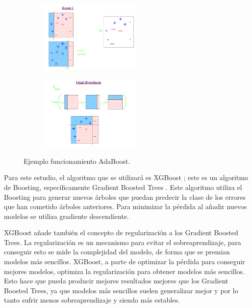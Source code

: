 \begin{figure}[H]
	\centering
	\begin{subfigure}{.4\textwidth}
		\centering
		\includegraphics[width=50mm]{imagenes/boosting_2.png}
	\end{subfigure}
	\hspace{0.01in}
	\begin{subfigure}{.4\textwidth}
		\centering
		\includegraphics[width=50mm]{imagenes/boosting_final.png}
	\end{subfigure}
	\caption{Ejemplo funcionamiento AdaBoost.}
	\label{fig:217}
\end{figure}
\verticalspace

Para este estudio, el algoritmo que se utilizará es XGBoost \cite{chen2016xgboost}; este es un algoritmo de Boosting, específicamente Gradient Boosted Trees \cite{friedman2002stochastic}. Este algoritmo utiliza el Boosting para generar nuevos árboles que puedan predecir la clase de los errores que han cometido árboles anteriores. Para minimizar la pérdida al añadir nuevos modelos se utiliza gradiente descendiente.\newline

XGBoost añade también el concepto de regularización a los Gradient Boosted Trees. La regularización es un mecanismo para evitar el sobreaprendizaje, para conseguir esto se mide la complejidad del modelo, de forma que se premian modelos más sencillos. XGBoost, a parte de optimizar la pérdida para conseguir mejores modelos, optimiza la regularización para obtener modelos más sencillos. Esto hace que pueda producir mejores resultados mejores que los Gradient Boosted Trees, ya que modelos más sencillos suelen generalizar mejor y por lo tanto sufrir menos sobreaprendizaje y siendo más estables.\newline

